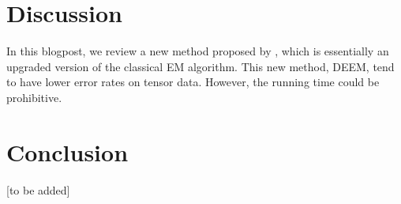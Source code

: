 \documentclass[11pt]{article}
\begin{document}
\section{Discussion}

In this blogpost, we review a new method proposed by \cite{mai2022DEEM}, which is essentially an upgraded version of the classical EM algorithm. This new method, DEEM, tend to have lower error rates on tensor data. However, the running time could be prohibitive. 

\section{Conclusion}

[to be added]

\begin{singlespace}
	
	
\end{singlespace}
\end{document}
